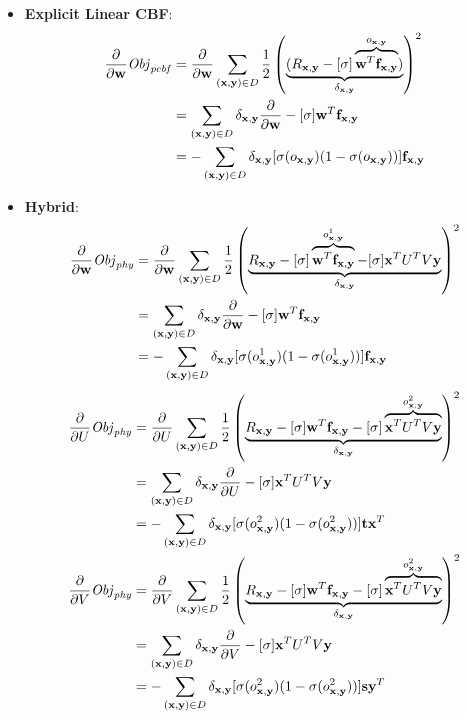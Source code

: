 \begin{itemize}
\item {\bf Explicit Linear CBF}:
\begin{align*}
\frac{\partial}{\partial \w} \Obj_\pcbf & = \frac{\partial}{\partial \w} \sum_{(\x,\y) \in D} \frac{1}{2} \left( \underbrace{(R_{\x,\y} - [\sigma] \overbrace{\w^T \f_{\x,\y}}^{o_{\x,\y}})}_{\delta_{\x,\y}} \right)^2\\
& = \sum_{(\x,\y) \in D} \delta_{\x,\y} \frac{\partial}{\partial \w} - [\sigma] \w^T \f_{\x,\y}\\
& = - \sum_{(\x,\y) \in D} \delta_{\x,\y} [\sigma(o_{\x,\y}) (1 - \sigma(o_{\x,\y}))] \f_{\x,\y}
\end{align*}

\item {\bf Hybrid}:
\begin{align*}
\frac{\partial}{\partial \w} \Obj_\phy & = \frac{\partial}{\partial \w} \sum_{(\x,\y) \in D} \frac{1}{2} \left( \underbrace{R_{\x,\y} - [\sigma] \overbrace{\w^T \f_{\x,\y}}^{o^1_{\x,\y}} - [\sigma] \x^T U^T V\y}_{\delta_{\x,\y}} \right)^2 \\
& = \sum_{(\x,\y) \in D} \delta_{\x,\y} \frac{\partial}{\partial \w} - [\sigma] \w^T \f_{\x,\y} \\
& = - \sum_{(\x,\y) \in D} \delta_{\x,\y} [\sigma(o^1_{\x,\y}) (1 - \sigma(o^1_{\x,\y}))] \f_{\x,\y} 
\end{align*}
\begin{align*}
\frac{\partial}{\partial U} \Obj_\phy & = \frac{\partial}{\partial U} \sum_{(\x,\y) \in D} \frac{1}{2} \left( \underbrace{R_{\x,\y} - [\sigma] \w^T \f_{\x,\y} - [\sigma] \overbrace{\x^T U^T V\y}^{o^2_{\x,\y}}}_{\delta_{\x,\y}}\right)^2 \\
& = \sum_{(\x,\y) \in D} \delta_{\x,\y} \frac{\partial}{\partial U} - [\sigma] \x^T U^T V\y \\
& = - \sum_{(\x,\y) \in D} \delta_{\x,\y} [\sigma(o^2_{\x,\y}) (1 - \sigma(o^2_{\x,\y}))] \t \x^T\\
\frac{\partial}{\partial V} \Obj_\phy & = \frac{\partial}{\partial V} \sum_{(\x,\y) \in D} \frac{1}{2} \left( \underbrace{R_{\x,\y} - [\sigma] \w^T \f_{\x,\y} - [\sigma] \overbrace{\x^T U^T V\y}^{o^2_{\x,\y}}}_{\delta_{\x,\y}}\right)^2 \\
& = \sum_{(\x,\y) \in D}  \delta_{\x,\y} \frac{\partial}{\partial V} - [\sigma] \x^T U^T V\y \\
& = - \sum_{(\x,\y) \in D}  \delta_{\x,\y} [\sigma(o^2_{\x,\y}) (1 - \sigma(o^2_{\x,\y}))] \s \y^T \\
\end{align*}


\end{itemize}
